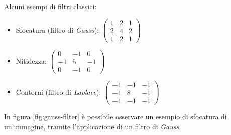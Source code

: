 Alcuni esempi di filtri classici:
\begin{itemize}
	\item Sfocatura (filtro di \textit{Gauss}): $\begin{pmatrix} 
		1 & 2 & 1 \\
		2 & 4 & 2\\
		1 & 2 & 1
	\end{pmatrix}$
	\item Nitidezza: $\begin{pmatrix} 
		0 & -1 & 0 \\
		-1 & 5 & -1\\
		0 & -1 & 0
	\end{pmatrix}$
	\item Contorni (filtro di \textit{Laplace}): $\begin{pmatrix} 
		-1 & -1 & -1 \\
		-1 & 8 & -1\\
		-1 & -1 & -1
	\end{pmatrix}$
\end{itemize}\par
In figura \ref{fig:gauss-filter} \`e possibile osservare un esempio di sfocatura di un'immagine, tramite l'applicazione di un filtro di \textit{Gauss}.
